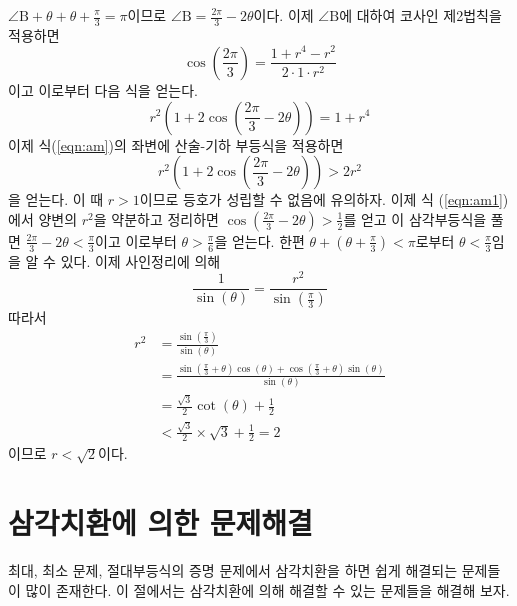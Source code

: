 \documentclass[11pt, a4paper]{book}
\begin{document}
\begin{problem}
{\begin{psolution}
\begin{figure}[H]
\begin{center}
	    \end{center}
	\end{figure}
$\angle \textrm{B}+\theta+\theta+\frac{\pi}{3}=\pi$이므로 $\angle\textrm{B}=\frac{2\pi}{3}-2\theta$이다. 이제 $\angle\textrm{B}$에 대하여 코사인 제2법칙을 적용하면
\begin{equation*}
	\cos\left(\frac{2\pi}{3}\right) =\frac{1+r^{4}-r^{2}}{2\cdot 1\cdot r^{2}}
\end{equation*}
이고 이로부터 다음 식을 얻는다.
\begin{equation}\label{eqn:am}
	r^{2}\left(1+2\cos\left(\frac{2\pi}{3}-2\theta\right)\right) = 1+r^{4}
\end{equation}
이제 식(\ref{eqn:am})의 좌변에 산술-기하 부등식을 적용하면 
\begin{equation}\label{eqn:am1}
	r^{2}\left(1+2\cos\left(\frac{2\pi}{3}-2\theta\right)\right) > 2r^{2}
\end{equation}
을 얻는다. 이 때 $r>1$이므로 등호가 성립할 수 없음에 유의하자. 이제 식 (\ref{eqn:am1})에서 양변의 $r^{2}$을 약분하고 정리하면 $\cos\left(\frac{2\pi}{3}-2\theta\right)>\frac{1}{2}$를 얻고 이 삼각부등식을 풀면 $\frac{2\pi}{3}-2\theta<\frac{\pi}{3}$이고 이로부터 $\theta>\frac{\pi}{6}$을 얻는다. 한편 $\theta +\left(\theta+\frac{\pi}{3}\right)<\pi$로부터 $\theta<\frac{\pi}{3}$임을 알 수 있다.
이제 사인정리에 의해 
\begin{equation*}
	\frac{1}{\sin(\theta)} =\frac{r^{2}}{\sin\left(\frac{\pi}{3}\right)}
\end{equation*}
따라서 
\begin{align*}
	r^{2} &=\frac{\sin\left(\frac{\pi}{3}\right)}{\sin(\theta)}\\
	&=\frac{\sin\left(\frac{\pi}{3}+\theta\right)\cos(\theta)+\cos\left(\frac{\pi}{3}+\theta\right)\sin(\theta)}{\sin(\theta)}\\
	&=\frac{\sqrt{3}}{2} \cot(\theta) +\frac{1}{2}\\
	&<\frac{\sqrt{3}}{2}\times \sqrt{3} +\frac{1}{2} = 2
\end{align*}
이므로 $r<\sqrt{2}$이다.
\end{psolution}
}
\end{problem}

\vspace{2em}
\section{삼각치환에 의한 문제해결}
최대, 최소 문제, 절대부등식의 증명 문제에서 삼각치환을 하면 쉽게 해결되는 문제들이 많이 존재한다. 이 절에서는 삼각치환에 의해 해결할 수 있는 문제들을 해결해 보자.
\end{document}
